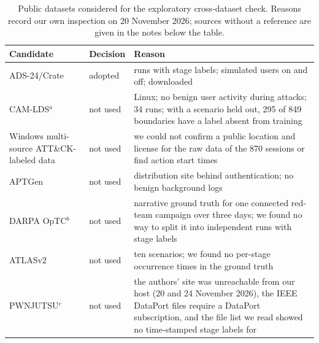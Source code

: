 \begin{table}[htbp]
\centering
\small
\caption[Public datasets considered for the exploratory cross-dataset check]{Public datasets considered for the exploratory cross-dataset
check. Reasons record our own inspection on 20 November 2026; sources
without a reference are given in the notes below the table.}
\label{tab:ads24-candidates}
\begin{tabularx}{\textwidth}{@{}>{\raggedright\arraybackslash}p{}l>{\raggedright\arraybackslash}X@{}}
\toprule
Candidate & Decision & Reason \\
\midrule
ADS-24/Crate~\cite{nyberg2026cyber} & adopted & 254 runs with stage labels;
  simulated users on and off; downloaded \\
CAM-LDS$^{a}$ & not used & Linux; no benign
  user activity during attacks; 34 runs; with a scenario held out, 295 of
  849 boundaries have a label absent from training \\
Windows multi-source ATT\&CK-labeled data~\cite{niloy2026multi} & not used
  & we could not confirm a public location and license for the raw data
  of the 870 sessions or find action start times \\
APTGen~\cite{takahashi2020aptgen} & not used & distribution site behind
  authentication; no benign background logs \\
DARPA OpTC$^{b}$ & not used & narrative ground truth for one connected
  red-team campaign over three days; we found no way to split it into
  independent runs with stage labels \\
ATLASv2~\cite{riddle2023atlasv2} & not used & ten scenarios; we found no
  per-stage occurrence times in the ground truth \\
PWNJUTSU$^{c}$~\cite{berady2022pwnjutsu} & not used & the authors' site was unreachable from our host
  (20 and 24 November 2026), the IEEE DataPort files require a DataPort
  subscription, and the file list we read showed no time-stamped stage labels for

\end{tabularx}
\end{table}
